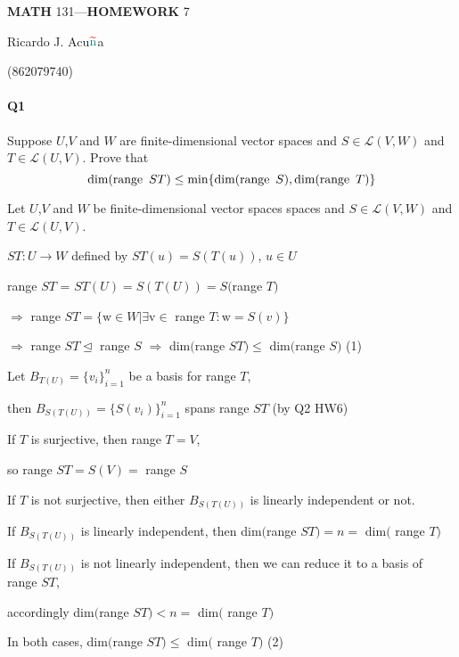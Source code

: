 \documentclass{article}
\begin{document}
\begin{center}
  \textbf{MATH} 131---\textbf{HOMEWORK} 7

  \color{red}R\color{teal}icardo
  \color{red}J\color{cyan}.
  \color{red}A\color{teal}cu$\color{red}{\widetilde{\color{teal}\text{n}}}$\color{teal}a\color{black}

  \color{teal}(\color{red}862079740\color{teal})\color{black}
\end{center}\vspace{1.618em}

\paragraph{Q1} Suppose $U$,$V$ and $W$ are finite-dimensional vector
spaces and $S \in \mathcal{L}(V,W)$ and $T \in
\mathcal{L}(U,V)$. Prove that
\[\text{dim(range}\enskip ST) \leq \text{min}\{\text{dim(range}\enskip
  S), \text{dim(range}\enskip T)\}\]
\vspace{0.618 em}

Let $U$,$V$ and $W$ be finite-dimensional vector spaces
spaces and $S \in \mathcal{L}(V,W)$ and $T \in
\mathcal{L}(U,V)$.

$ST: U \rightarrow W$ defined by $ST(u) = S(T(u))$, $u \in U$

range $ST$ = $ST(U) = S(T(U)) = S$$($range $T)$

$\Rightarrow$ range $ST = \{\mathrm{w} \in W | \exists \mathrm{v} \in$ range $T:
\mathrm{w} = S(v)\}$

$\Rightarrow$ range $ST \trianglelefteq$ range $S$
$\Rightarrow$ dim$($range $ST) \leq$ dim$($range $S)$ (1)

Let $B_{T(U)} = \{v_i\}_{i=1}^n$ be a basis for range $T$,

then
$B_{S(T(U))} = \{S(v_i)\}_{i=1}^n$ spans range $ST$ (by Q2 HW6)

If $T$ is surjective, then range $T = V$,

so range $ST = S(V) =$ range $S$

If $T$ is not surjective,
then either $B_{S(T(U))}$ is linearly
independent or not.

If $B_{S(T(U))}$ is linearly independent, then dim$($range $ST)
= n =$ dim$($ range $T)$

If $B_{S(T(U))}$ is not linearly independent, then we can reduce it
to a basis of range $ST$,

accordingly dim$($range $ST) < n =$ dim$($ range $T)$

In both cases, dim$($range $ST) \leq $ dim$($ range $T)$ (2)
\end{document}
